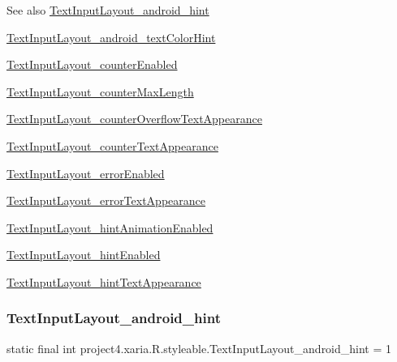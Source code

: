 \begin{DoxySeeAlso}{See also}
\hyperlink{classproject4_1_1xaria_1_1R_1_1styleable_ae1bb656c3c7642a885f1739b13f02e81}{Text\+Input\+Layout\+\_\+android\+\_\+hint} 

\hyperlink{classproject4_1_1xaria_1_1R_1_1styleable_ad0454b679c861e8e4733869036a95b28}{Text\+Input\+Layout\+\_\+android\+\_\+text\+Color\+Hint} 

\hyperlink{classproject4_1_1xaria_1_1R_1_1styleable_abe72b67bbd7e17ba750c31e1e301e1e2}{Text\+Input\+Layout\+\_\+counter\+Enabled} 

\hyperlink{classproject4_1_1xaria_1_1R_1_1styleable_a48eeaeeae4c8fc24f978d05e0930288c}{Text\+Input\+Layout\+\_\+counter\+Max\+Length} 

\hyperlink{classproject4_1_1xaria_1_1R_1_1styleable_afcc440aa8b04e1782ae4bcdcab6d0d74}{Text\+Input\+Layout\+\_\+counter\+Overflow\+Text\+Appearance} 

\hyperlink{classproject4_1_1xaria_1_1R_1_1styleable_a1317388c37206a92cac615b2e1bce472}{Text\+Input\+Layout\+\_\+counter\+Text\+Appearance} 

\hyperlink{classproject4_1_1xaria_1_1R_1_1styleable_aa75e51a42b96d39550dcd078cc70a0d7}{Text\+Input\+Layout\+\_\+error\+Enabled} 

\hyperlink{classproject4_1_1xaria_1_1R_1_1styleable_ad38bee143dd17467370cd16a83428514}{Text\+Input\+Layout\+\_\+error\+Text\+Appearance} 

\hyperlink{classproject4_1_1xaria_1_1R_1_1styleable_a54817cff7e70ea97df2faf7653859bd4}{Text\+Input\+Layout\+\_\+hint\+Animation\+Enabled} 

\hyperlink{classproject4_1_1xaria_1_1R_1_1styleable_ad51c0cb02e0a3966e40c64db946ea60a}{Text\+Input\+Layout\+\_\+hint\+Enabled} 

\hyperlink{classproject4_1_1xaria_1_1R_1_1styleable_a309a9958fd85c366ec2a1e08ff0f0212}{Text\+Input\+Layout\+\_\+hint\+Text\+Appearance} 
\end{DoxySeeAlso}
\mbox{\label{classproject4_1_1xaria_1_1R_1_1styleable_ae1bb656c3c7642a885f1739b13f02e81}} 
\subsubsection{\texorpdfstring{Text\+Input\+Layout\+\_\+android\+\_\+hint}{TextInputLayout\_android\_hint}}
{\footnotesize\ttfamily static final int project4.\+xaria.\+R.\+styleable.\+Text\+Input\+Layout\+\_\+android\+\_\+hint = 1\hspace{0.3cm}{\ttfamily [static]}}


